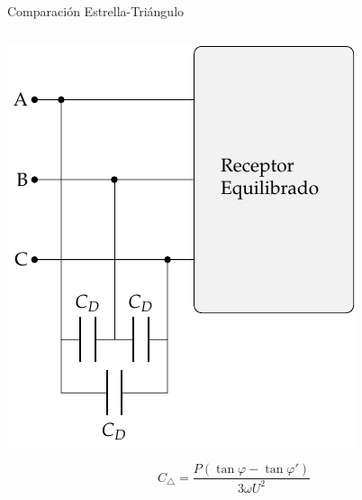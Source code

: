 \documentclass[aspectratio=169, usenames,svgnames,dvipsnames]{beamer}
\begin{document}
\begin{frame}[label={sec:org9b44b45}]{Comparación Estrella-Triángulo}
\begin{columns}
\begin{column}{0.5\columnwidth}
\begin{center}
\includegraphics[height=0.55\textheight]{../figs/CircuitoTrifasica_CompensacionReactiva.pdf}
\end{center}
\[
  \boxed{C_\triangle = \frac{P(\tan \varphi - \tan \varphi')}{3 \omega U^2}}
\]
\end{column}


\end{columns}
\end{frame}
\end{document}

